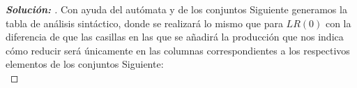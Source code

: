 \documentclass{article}
\begin{document}
\begin{enumerate}
\begin{enumerate}
\begin{proof}[\textbf{Solución: }]
            Con ayuda del autómata y de los conjuntos Siguiente generamos la tabla de análisis sintáctico, donde se realizará lo mismo que para $LR(0)$ con la diferencia de que las casillas en las que se añadirá la producción que nos indica cómo reducir será únicamente en las columnas correspondientes a los respectivos elementos de los conjuntos Siguiente: \\

            \vspace{10pt}


\end{proof}
\end{enumerate}
\end{enumerate}
\end{document}

